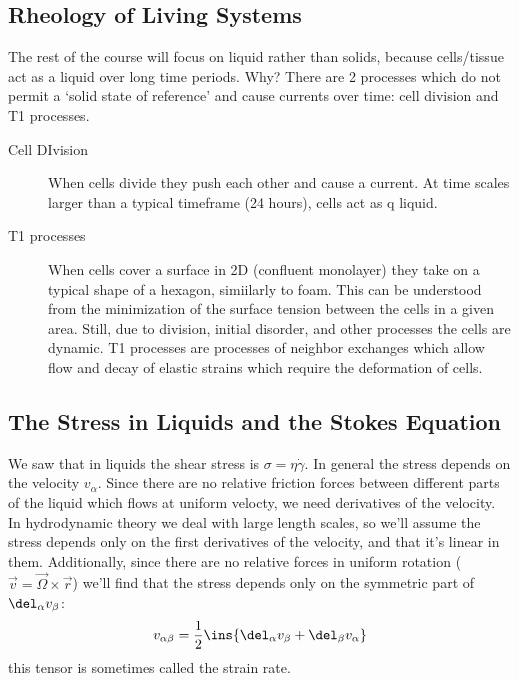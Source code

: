\subsection{Rheology of Living Systems}
The rest of the course will focus on liquid rather than solids, because cells/tissue act as a liquid over long time periods. Why? There are 2 processes which do not permit a `solid state of reference' and cause currents over time: cell division and T1 processes.
\begin{description}
    \item[Cell DIvision] When cells divide they push each other and cause a current. At time scales larger than a typical timeframe (24 hours), cells act as q liquid.
    \item[T1 processes] When cells cover a surface in 2D (confluent monolayer) they take on a typical shape of a hexagon, simiilarly to foam. This can be understood from the minimization of the surface tension between the cells in a given area. Still, due to division, initial disorder, and other processes the cells are dynamic. T1 processes are processes of neighbor exchanges which allow flow and decay of elastic strains which require the deformation of cells.
\end{description}
\subsection{The Stress in Liquids and the Stokes Equation}
We saw that in liquids the shear stress is \(\sigma = \eta\dot{\gamma}\). In general the stress depends on the velocity \(v_\alpha \). Since there are no relative friction forces between different parts of the liquid which flows at uniform velocty, we need derivatives of the velocity. In hydrodynamic theory we deal with large length scales, so we'll assume the stress depends only on the first derivatives of the velocity, and that it's linear in them. Additionally, since there are no relative forces in uniform rotation (\(\vec{v} = \vec{\Omega}\times\vec{r}\)) we'll find that the stress depends only on the symmetric part of \(\del_\alpha v_\beta \):
\begin{equation}
    v_{\alpha\beta} = \frac{1}{2} \ins{\del_\alpha v_\beta + \del_\beta v_\alpha}
\end{equation}
this tensor is sometimes called the strain rate.